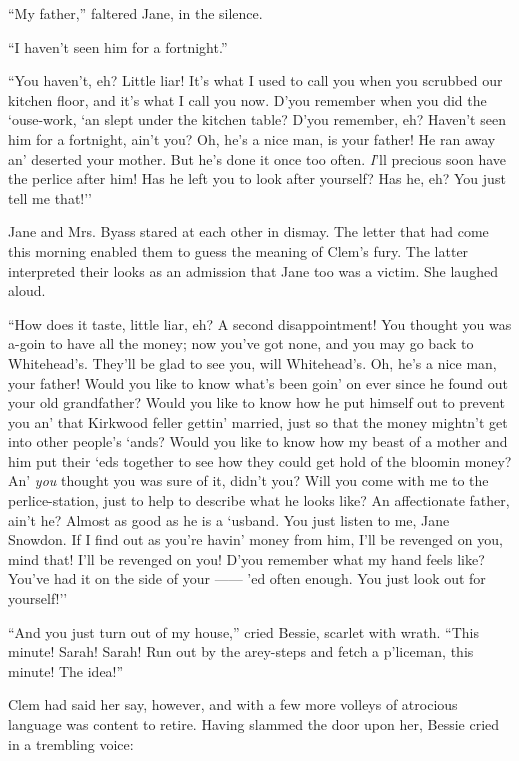 ``My father,'' faltered Jane, in the silence.

``I haven't seen him for a fortnight.''

``You haven't, eh? Little liar! It's what I used to call you when you
scrubbed our kitchen floor, and it's what I call you now. D'you remember
when you did the `ouse-work, `an slept under the kitchen table? D'you
remember, eh? Haven't seen him for a fortnight, ain't you? Oh, he's a
nice man, is your father! He ran away an' deserted your mother. But he's
done it once too often. \emph{I}'ll precious soon have the perlice after
him! Has he left you to look after yourself? Has he, eh? You just tell
me that!''

Jane and Mrs. Byass stared at each other in dismay. The letter that had
come this morning enabled them to guess the meaning of Clem's fury. The
latter interpreted their {\protect\hypertarget{246}{}{}}looks as an
admission that Jane too was a victim. She laughed aloud.

``How does it taste, little liar, eh? A second disappointment! You
thought you was a-goin to have all the money; now you've got none, and
you may go back to Whitehead's. They'll be glad to see you, will
Whitehead's. Oh, he's a nice man, your father! Would you like to know
what's been goin' on ever since he found out your old grandfather? Would
you like to know how he put himself out to prevent you an' that Kirkwood
feller gettin' married, just so that the money mightn't get into other
people's `ands? Would you like to know how my beast of a mother and him
put their `eds together to see how they could get hold of the bloomin
money? An' \emph{you} thought you was sure of it, didn't you? Will you
come with me to the perlice-station, just to help to describe what he
looks like? An affectionate father, ain't he? Almost as good as he is a
`usband. You just listen to me, Jane Snowdon. If I find out as you're
havin' money from him, I'll be revenged on you, mind that! I'll be
revenged on you! D'you remember what my hand feels
{\protect\hypertarget{247}{}{}}like? You've had it on the side of your
{{------}} 'ed often enough. You just look out for yourself!''

``And you just turn out of my house,'' cried Bessie, scarlet with wrath.
``This minute! Sarah! Sarah! Run out by the arey-steps and fetch a
p'liceman, this minute! The idea!''

Clem had said her say, however, and with a few more volleys of atrocious
language was content to retire. Having slammed the door upon her, Bessie
cried in a trembling voice:

